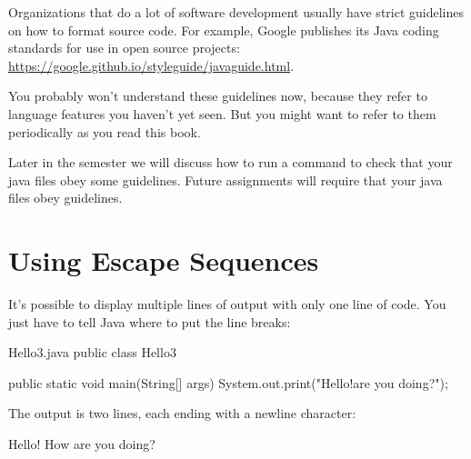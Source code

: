 

Organizations that do a lot of software development usually have strict guidelines on how to format source code.
For example, Google publishes its Java coding standards for use in open source projects: \url{https://google.github.io/styleguide/javaguide.html}.

You probably won't understand these guidelines now, because they refer to language features you haven't yet seen.
But you might want to refer to them periodically as you read this book.


Later in the semester we will discuss how to run a command to check that your 
java files obey some guidelines. Future assignments will require that your java files
obey guidelines.

\section{Using Escape Sequences}

It's possible to display multiple lines of output with only one line of code.
You just have to tell Java where to put the line breaks:

\begin{trinket}[220]{Hello3.java}
public class Hello3 {

    public static void main(String[] args) {
        System.out.print("Hello!\nHow are you doing?\n");
    }
}
\end{trinket}

The output is two lines, each ending with a newline character:

\begin{stdout}
Hello!
How are you doing?
\end{stdout}

